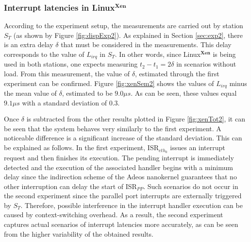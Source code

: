\documentclass{acm_proc_article-sp}
\begin{document}
\subsubsection*{Interrupt latencies in Linux$^{\mathbf{Xen}}$}
\label{sec:latIrq}

According to the experiment setup, the measurements are carried out by station $S_T$
(as shown by Figure \ref{fig:dispExp2}). As explained in Section \ref{sec:exp2},
there is an extra delay $\delta$ that must be considered in the measurements. This
delay corresponds to the value of $L_{irq}$ in $S_T$. In other words, since
Linux$^{\mathbf{Xen}}$ is being used in both stations, one expects measuring $t_2 -
t_1 = 2 \delta$ in scenarios without load. From this measurement, the value of
$\delta$, estimated through the first experiment can be confirmed. Figure
\ref{fig:xenSem2} shows the values of $L_{irq}$ minus the mean value of $\delta$,
estimated to be $9.0 \mu s$. As can be seen, these values equal $9.1 \mu s$ with a
standard deviation of $0.3$.


Once $\delta$ is subtracted from the other results plotted in Figure
\ref{fig:xenTot2}, it can be seen that the system behaves very similarly to the
first experiment.  A noticeable difference is a significant increase of the standard
deviation. This can be explained as follows. In the first experiment, ISR$_{eth_0}$
issues an interrupt request and then finishes its execution. The pending interrupt
is immediately detected and the execution of the associated handler begins with a
minimum delay since the indirection scheme of the Adeos nanokernel guarantees that
no other interruption can delay the start of ISR$_{PP}$. Such scenarios do not occur
in the second experiment since the parallel port interrupts are externally triggered
by $S_T$. Therefore, possible interference in the interrupt handler execution can be
caused by context-switching overhead. As a result, the second experiment captures
actual scenarios of interrupt latencies more accurately, as can be seen from the
higher variability of the obtained results.

%
 
\end{document}
